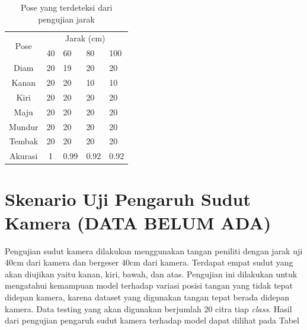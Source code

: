 \begin{table}[H]
  \centering
  \caption{Pose yang terdeteksi dari pengujian jarak}
  \label{tab:hasiljarak}
  \begin{tabular}{|c|clll|}
    \hline
    \multirow{2}{*}{Pose} & \multicolumn{4}{c|}{Jarak (cm)}                                                   \\ \cline{2-5} 
                          & \multicolumn{1}{l|}{40} & \multicolumn{1}{l|}{60} & \multicolumn{1}{l|}{80} & 100 \\ \hline
    Diam                  & \multicolumn{1}{c|}{20}   & \multicolumn{1}{l|}{19}   & \multicolumn{1}{l|}{20}   &   20  \\ \hline
    Kanan                 & \multicolumn{1}{c|}{20}   & \multicolumn{1}{l|}{20}   & \multicolumn{1}{l|}{10}   &   10  \\ \hline
    Kiri                  & \multicolumn{1}{c|}{20}   & \multicolumn{1}{l|}{20}   & \multicolumn{1}{l|}{20}   &   20  \\ \hline
    Maju                  & \multicolumn{1}{c|}{20}   & \multicolumn{1}{l|}{20}   & \multicolumn{1}{l|}{20}   &   20  \\ \hline
    Mundur                & \multicolumn{1}{c|}{20}   & \multicolumn{1}{l|}{20}   & \multicolumn{1}{l|}{20}   &   20  \\ \hline
    Tembak                & \multicolumn{1}{c|}{20}   & \multicolumn{1}{l|}{20}   & \multicolumn{1}{l|}{20}   &   20  \\ \hline
    Akurasi                  & \multicolumn{1}{c|}{1}   & \multicolumn{1}{l|}{0.99}   & \multicolumn{1}{l|}{0.92}   &   0.92  \\ \hline
  \end{tabular}
\end{table}


\section{Skenario Uji Pengaruh Sudut Kamera (DATA BELUM ADA)}
Pengujian sudut kamera dilakukan menggunakan tangan peniliti dengan jarak uji 40cm dari kamera dan bergeser 40cm dari kamera. Terdapat empat sudut yang akan diujikan yaitu kanan, kiri, bawah, dan atas. Pengujian ini dilakukan untuk mengatahui kemampuan model terhadap variasi posisi tangan yang tidak tepat didepan kamera, karena dataset yang digunakan tangan tepat berada didepan kamera. Data testing yang akan digunakan berjumlah 20 citra tiap \emph{class}. Hasil dari pengujian pengaruh sudut kamera terhadap model dapat dilihat pada Tabel

